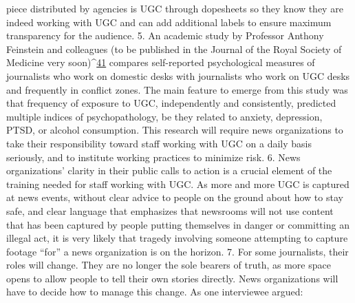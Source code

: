 \begin{enumerate}
piece distributed by agencies is UGC through dopesheets so they
know they are indeed working with UGC and can add additional
labels to ensure maximum transparency for the audience.
5. An academic study by Professor Anthony Feinstein and colleagues
(to be published in the Journal of the Royal Society of Medicine very
soon)^{\href{#endnotes}{41}} compares self-reported psychological measures of journalists
who work on domestic desks with journalists who work on UGC
desks and frequently in conflict zones. The main feature to emerge
from this study was that frequency of exposure to UGC, independently
and consistently, predicted multiple indices of psychopathology,
be they related to anxiety, depression, PTSD, or alcohol
consumption. This research will require news organizations to take
their responsibility toward staff working with UGC on a daily basis
seriously, and to institute working practices to minimize risk.
6. News organizations' clarity in their public calls to action is a crucial
element of the training needed for staff working with UGC. As
more and more UGC is captured at news events, without clear advice
to people on the ground about how to stay safe, and clear language
that emphasizes that newsrooms will not use content that has been
captured by people putting themselves in danger or committing an
illegal act, it is very likely that tragedy involving someone attempting
to capture footage ``for'' a news organization is on the horizon.
7. For some journalists, their roles will change. They are no longer
the sole bearers of truth, as more space opens to allow people to
tell their own stories directly. News organizations will have to decide
how to manage this change. As one interviewee argued:


\end{enumerate}
